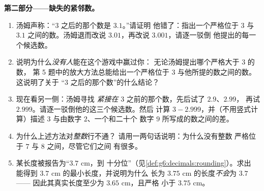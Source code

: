 \begin{problem}
\medskip
\noindent\textbf{第二部分——缺失的紧邻数。}
\begin{enumerate}[resume]
  \item 汤姆声称：“$3$ 之后的那个数是 $3.1$。”请证明
        他错了：指出一个严格位于 $3$ 与
        $3.1$ 之间的数。汤姆退而改说 $3.01$，再改说 $3.001$，请逐一驳倒
        他提出的每一个候选数。
  \item 说明为什么\emph{没有人}能在这个游戏中赢过你：
        无论汤姆提出哪个严格大于 $3$ 的数，
        第 5 题中的放大方法总能给出一个严格位于
        $3$ 与他所提的数之间的数。这说明了关于
        “$3$ 之后的那个数”的什么结论？
  \item 现在看另一侧：汤姆寻找
        \emph{紧接在} $3$ 之前的那个数，先后试了 $2.9$、$2.99$，
        再试 $2.999$。请逐一驳倒他的这三个候选数。然后
        计算 $3 - 2.999$，并（不用竖式计算）描述
        $3$ 与由数字 $2$、一个和二十个
        数字 $9$ 所写成的数之间的差。
  \item 为什么上述方法对\emph{整数}行不通？
        请用一两句话说明：为什么没有整数
        严格位于 $7$ 与 $8$ 之间，尽管它们之间
        有很多。
  \item 某长度被报告为“$3.7$ cm，到
        十分位”（见\cref{def:g6:decimals:rounding}）。求出
        能得到 $3.7$ cm 的最小长度，并说明为什么
        长为 $3.75$ cm 的长度\emph{不会}为 $3.7$——
        因此其真实长度至少为 $3.65$ cm，且严格
        小于 $3.75$ cm。
\end{enumerate}


\end{problem}
